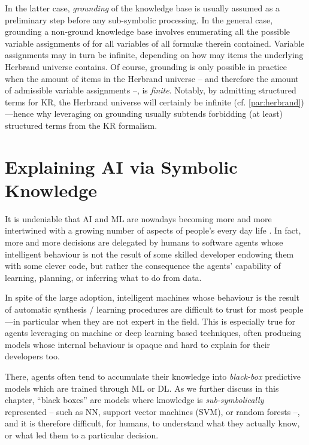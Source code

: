 \documentclass[12pt,a4paper,openright,twoside]{book}
\begin{document}
In the latter case, \emph{grounding} of the knowledge base is usually assumed as a preliminary step before any sub-symbolic processing.
%
In the general case, grounding a non-ground knowledge base involves enumerating all the possible variable assignments of for all variables of all formul\ae{} therein contained.
%
Variable assignments may in turn be infinite, depending on how may items the underlying Herbrand universe contains.
%
Of course, grounding is only possible in practice when the amount of items in the Herbrand universe -- and therefore the amount of admissible variable assignments --, is \emph{finite}.
%
Notably, by admitting structured terms for KR, the Herbrand universe will certainly be infinite (cf. \cref{par:herbrand})---hence why leveraging on grounding usually subtends forbidding (at least) structured terms from the KR formalism.

\chapter{Explaining AI via Symbolic Knowledge}\label{chap:explaining}

It is undeniable that AI and ML are nowadays becoming more and more intertwined with a growing number of aspects of people's every day life \cite{helbing2019, elliott2019}.
%
In fact, more and more decisions are delegated by humans to software agents whose intelligent behaviour is not the result of some skilled developer endowing them with some clever code, but rather the consequence the agents' capability of learning, planning, or inferring what to do from data.

In spite of the large adoption, intelligent machines whose behaviour is the result of automatic synthesis / learning procedures are difficult to trust for most people---in particular when they are not expert in the field.
%
This is especially true for agents leveraging on machine or deep learning based techniques, often producing models whose internal behaviour is opaque and hard to explain for their developers too.

There, agents often tend to accumulate their knowledge into \emph{black-box} predictive models which are trained through ML or DL.
%
As we further discuss in this chapter, ``black boxes'' are models where knowledge is \emph{sub-symbolically} represented -- such as NN, support vector machines (SVM), or random forests --, and it is therefore difficult, for humans, to understand what they actually know, or what led them to a particular decision.
\end{document}
